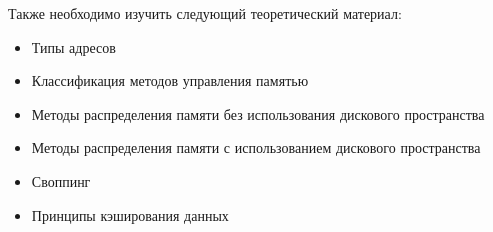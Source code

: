 \documentclass[a4paper,12pt]{article}
\begin{document}
    Также необходимо изучить следующий теоретический материал:
    \begin{itemize}
        \item Типы адресов
        \item Классификация методов управления памятью
        \item Методы распределения памяти без использования дискового пространства
        \item Методы распределения памяти с использованием дискового пространства
        \item Своппинг
        \item Принципы кэширования данных
    \end{itemize}
\end{document}
